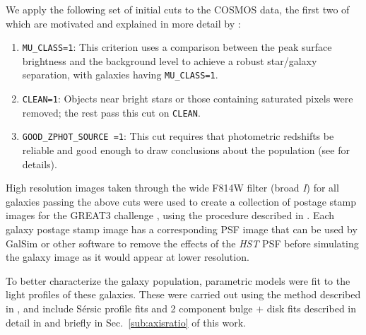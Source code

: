 \documentclass[twocolumn,useAMS,usenatbib]{mn2e}
\newcommand{\rachel}[1]{{\textcolor{red}{#1}}}
\newcommand{\arun}[1]{{\textcolor{blue}{#1}}}
\newcommand{\sersic}{S\'{e}rsic }
\begin{document}
We apply the following set of initial cuts to the COSMOS data, the
first two of which
are motivated and explained in more detail by \cite{COSMOS_Alexie}:
\begin{enumerate}
 \item \texttt{MU\_CLASS=1}: This criterion uses a comparison between
   the peak surface brightness and the background level to achieve a
   robust star/galaxy separation, with galaxies having \texttt{MU\_CLASS=1}. 
 \item \texttt{CLEAN=1}: Objects near bright stars or those containing
   saturated pixels were removed; the rest pass this cut on \texttt{CLEAN}. 
 \item \texttt{GOOD\_ZPHOT\_SOURCE =1}: This cut requires that
   photometric redshifts be reliable and good enough to draw
   conclusions about the population (see \citealt{2012MNRAS.420.1518M}
   for details).
\end{enumerate}

High resolution images taken through the wide F814W filter (broad
\emph{I}) for all galaxies passing the above cuts were used to create
a collection of postage stamp images for the GREAT3 challenge
\citep{great3}, using the procedure described in
\cite{2012MNRAS.420.1518M}.  Each galaxy postage stamp image has a
corresponding PSF image that can be used by {\sc GalSim} or other
software to remove the effects of the {\em HST} PSF before simulating
the galaxy image as it would appear at lower resolution.

To better characterize the galaxy population, parametric models were
fit to the light profiles of these galaxies.  These were carried out
using the method described in \cite{Claire_Fits}, and include
\sersic profile fits and 
2 component bulge $+$ disk fits described in detail in \cite{great3}
and briefly in Sec.~\ref{sub:axisratio} of this work.  
\end{document}
